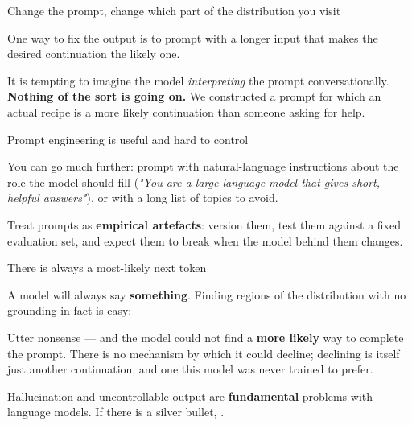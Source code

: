 \documentclass[aspectratio=169,11pt,t]{beamer}
\begin{document}
\begin{frame}[shrink=25]{Change the prompt, change which part of the distribution you visit}
{\fontsize{9.4}{12.6}\selectfont\color{fg2}One way to fix the output is to prompt with a longer input that makes the desired continuation the likely one.\par}\vskip 4pt
\begin{iband}[signal]
It is tempting to imagine the model \textit{interpreting} the prompt conversationally. \textbf{Nothing of the sort is going on.} We constructed a prompt for which an actual recipe is a more likely continuation than someone asking for help.
\end{iband}
\end{frame}

\begin{frame}[shrink=25]{Prompt engineering is useful and hard to control}
{\fontsize{9.4}{12.6}\selectfont\color{fg2}You can go much further: prompt with natural-language instructions about the role the model should fill (\textit{"You are a large language model that gives short, helpful answers"}), or with a long list of topics to avoid.\par}\vskip 4pt
\begin{iquote}
\end{iquote}
{\fontsize{9.4}{12.6}\selectfont\color{fg2}Treat prompts as \textbf{empirical artefacts}: version them, test them against a fixed evaluation set, and expect them to break when the model behind them changes.\par}\vskip 4pt
\end{frame}

\begin{frame}[shrink=25]{There is always a most-likely next token}
{\fontsize{9.4}{12.6}\selectfont\color{fg2}A model will always say \textbf{something}. Finding regions of the distribution with no grounding in fact is easy:\par}\vskip 4pt
{\fontsize{9.4}{12.6}\selectfont\color{fg2}Utter nonsense --- and the model could not find a \textbf{more likely} way to complete the prompt. There is no mechanism by which it could decline; declining is itself just another continuation, and one this model was never trained to prefer.\par}\vskip 4pt
\begin{iband}[rose]
Hallucination and uncontrollable output are \textbf{fundamental} problems with language models. If there is a silver bullet, .
\end{iband}
\end{frame}
\end{document}
